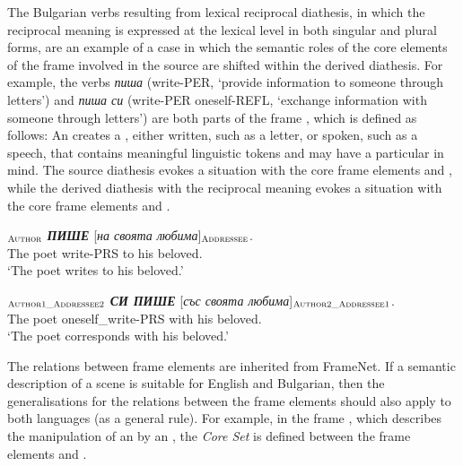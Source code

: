 \documentclass[output=paper,colorlinks,citecolor=brown]{langscibook}
\begin{document}
The Bulgarian verbs resulting from lexical reciprocal diathesis, in which the reciprocal meaning is expressed at the lexical level in both singular and plural forms, are an example of a case in which the semantic roles of the core elements of the frame involved in the source are shifted within the derived diathesis. For example, the verbs \textit{пиша} (write-PER, `provide information to someone through letters') and \textit{пиша си} (write-PER oneself-REFL, `exchange information with someone through letters') are both parts of the frame , which is defined as follows: An  creates a , either written, such as a letter, or spoken, such as a speech, that contains meaningful linguistic tokens and may have a particular  in mind. The source diathesis evokes a situation with the core frame elements  and , while the derived diathesis with the reciprocal meaning evokes a situation with the core frame elements  and .

\begin{exe}
 \ex  \label{ch01:ex:38}
 $_{\text{\textsc{Author}}}$   \textit{\textbf{ПИШЕ}}    [\textit{на своята любима}]$_{\text{\textsc{Addressee}}}$. \\
 {The poet} write-PRS  {to his beloved}. \\
 \glt `The poet writes to his beloved.'
 \end{exe} 
 
\begin{exe}
 \ex  \label{ch01:ex:39}
 \gll   [Поетът]$_{\text{\textsc{Author1\_Addressee2}}}$  \textit{\textbf{СИ ПИШЕ}} [\textit{със своята любима}]$_{\text{\textsc{Author2\_Addressee1}}}$. \\
 {The poet}  oneself\_write-PRS {with his beloved}. \\
 \glt `The poet corresponds with his beloved.'
 \end{exe} 
  


The relations between frame elements are inherited from FrameNet. If a semantic description of a scene is suitable for English and Bulgarian, then the generalisations for the relations between the frame elements should also apply to both languages (as a general rule). For example, in the frame , which describes the manipulation of an  by an , the \textit{Core Set} is defined between the frame elements  and .
\end{document}
